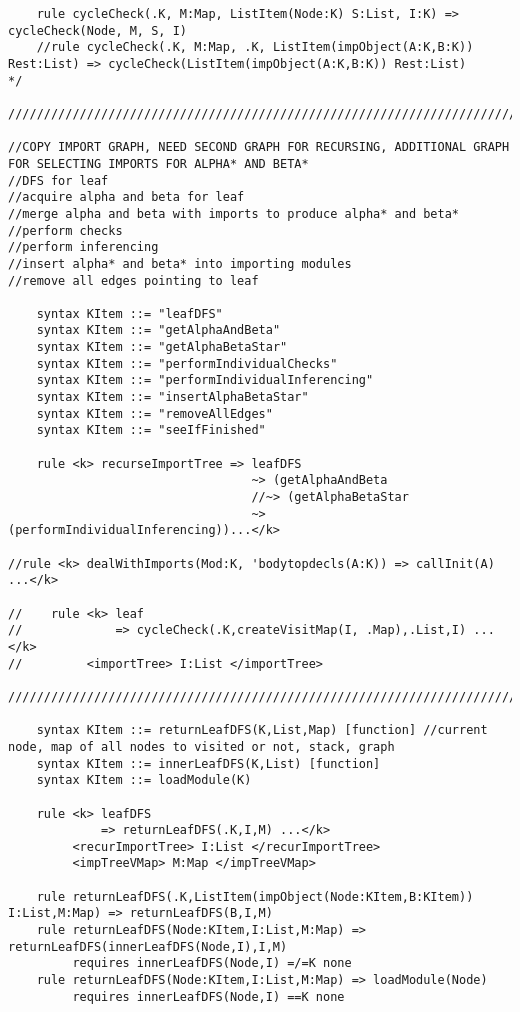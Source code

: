 \begin{lstlisting}
    rule cycleCheck(.K, M:Map, ListItem(Node:K) S:List, I:K) => cycleCheck(Node, M, S, I)
    //rule cycleCheck(.K, M:Map, .K, ListItem(impObject(A:K,B:K)) Rest:List) => cycleCheck(ListItem(impObject(A:K,B:K)) Rest:List)
*/

////////////////////////////////////////////////////////////////////////////////////////////////////////////////////////

//COPY IMPORT GRAPH, NEED SECOND GRAPH FOR RECURSING, ADDITIONAL GRAPH FOR SELECTING IMPORTS FOR ALPHA* AND BETA*
//DFS for leaf
//acquire alpha and beta for leaf
//merge alpha and beta with imports to produce alpha* and beta*
//perform checks
//perform inferencing
//insert alpha* and beta* into importing modules
//remove all edges pointing to leaf

    syntax KItem ::= "leafDFS"
    syntax KItem ::= "getAlphaAndBeta"
    syntax KItem ::= "getAlphaBetaStar"
    syntax KItem ::= "performIndividualChecks"
    syntax KItem ::= "performIndividualInferencing"
    syntax KItem ::= "insertAlphaBetaStar"
    syntax KItem ::= "removeAllEdges"
    syntax KItem ::= "seeIfFinished"

    rule <k> recurseImportTree => leafDFS 
                                  ~> (getAlphaAndBeta
                                  //~> (getAlphaBetaStar
                                  ~> (performIndividualInferencing))...</k>

//rule <k> dealWithImports(Mod:K, 'bodytopdecls(A:K)) => callInit(A) ...</k>

//    rule <k> leaf
//             => cycleCheck(.K,createVisitMap(I, .Map),.List,I) ...</k>
//         <importTree> I:List </importTree>

////////////////////////////////////////////////////////////////////////////////////////////////////////////////////////

    syntax KItem ::= returnLeafDFS(K,List,Map) [function] //current node, map of all nodes to visited or not, stack, graph
    syntax KItem ::= innerLeafDFS(K,List) [function]
    syntax KItem ::= loadModule(K)

    rule <k> leafDFS
             => returnLeafDFS(.K,I,M) ...</k>
         <recurImportTree> I:List </recurImportTree>
         <impTreeVMap> M:Map </impTreeVMap>

    rule returnLeafDFS(.K,ListItem(impObject(Node:KItem,B:KItem)) I:List,M:Map) => returnLeafDFS(B,I,M)
    rule returnLeafDFS(Node:KItem,I:List,M:Map) => returnLeafDFS(innerLeafDFS(Node,I),I,M)
         requires innerLeafDFS(Node,I) =/=K none
    rule returnLeafDFS(Node:KItem,I:List,M:Map) => loadModule(Node)
         requires innerLeafDFS(Node,I) ==K none


\end{lstlisting}
